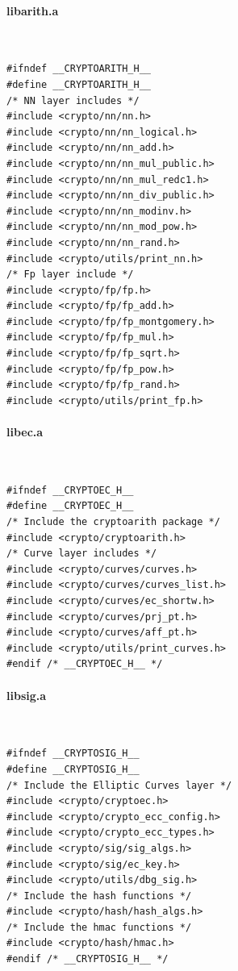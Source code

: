 \begin{center}
\begin{minipage}{.475\textwidth}
\paragraph{libarith.a}\ \\
\begin{lstlisting}[style=cstyle, caption={include/cryptoarith.h}, captionpos=t]
#ifndef __CRYPTOARITH_H__
#define __CRYPTOARITH_H__
/* NN layer includes */
#include <crypto/nn/nn.h>
#include <crypto/nn/nn_logical.h>
#include <crypto/nn/nn_add.h>
#include <crypto/nn/nn_mul_public.h>
#include <crypto/nn/nn_mul_redc1.h>
#include <crypto/nn/nn_div_public.h>
#include <crypto/nn/nn_modinv.h>
#include <crypto/nn/nn_mod_pow.h>
#include <crypto/nn/nn_rand.h>
#include <crypto/utils/print_nn.h>
/* Fp layer include */
#include <crypto/fp/fp.h>
#include <crypto/fp/fp_add.h>
#include <crypto/fp/fp_montgomery.h>
#include <crypto/fp/fp_mul.h>
#include <crypto/fp/fp_sqrt.h>
#include <crypto/fp/fp_pow.h>
#include <crypto/fp/fp_rand.h>
#include <crypto/utils/print_fp.h>
\end{lstlisting}
\end{minipage}\hfill
\begin{minipage}{.475\textwidth}
\paragraph{libec.a}\ \\
\begin{lstlisting}[style=cstyle, caption={include/cryptoec.h}, captionpos=t]
#ifndef __CRYPTOEC_H__
#define __CRYPTOEC_H__
/* Include the cryptoarith package */
#include <crypto/cryptoarith.h>
/* Curve layer includes */
#include <crypto/curves/curves.h>
#include <crypto/curves/curves_list.h>
#include <crypto/curves/ec_shortw.h>
#include <crypto/curves/prj_pt.h>
#include <crypto/curves/aff_pt.h>
#include <crypto/utils/print_curves.h>
#endif /* __CRYPTOEC_H__ */
\end{lstlisting}
\paragraph{libsig.a}\ \\
\begin{lstlisting}[style=cstyle, caption={include/cryptosig.h}, captionpos=t]
#ifndef __CRYPTOSIG_H__
#define __CRYPTOSIG_H__
/* Include the Elliptic Curves layer */
#include <crypto/cryptoec.h>
#include <crypto/crypto_ecc_config.h>
#include <crypto/crypto_ecc_types.h>
#include <crypto/sig/sig_algs.h>
#include <crypto/sig/ec_key.h>
#include <crypto/utils/dbg_sig.h>
/* Include the hash functions */
#include <crypto/hash/hash_algs.h>
/* Include the hmac functions */
#include <crypto/hash/hmac.h>
#endif /* __CRYPTOSIG_H__ */
\end{lstlisting}
\end{minipage}
\end{center}

